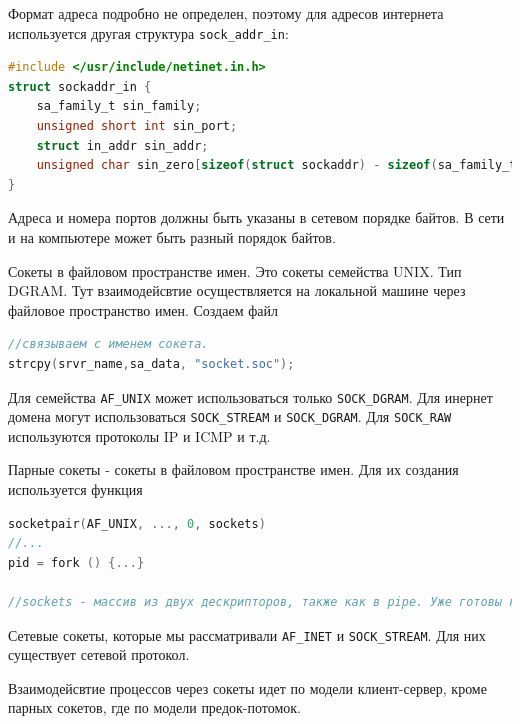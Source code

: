 Формат адреса подробно не определен, поэтому для адресов интернета используется другая структура \verb|sock_addr_in|:

\begin{lstlisting}[language=c]
#include </usr/include/netinet.in.h>
struct sockaddr_in {
	sa_family_t sin_family;
	unsigned short int sin_port;
	struct in_addr sin_addr;
	unsigned char sin_zero[sizeof(struct sockaddr) - sizeof(sa_family_t) - sizeof(uint16_t) - sizeof(struct in_addr)];
}
\end{lstlisting}

Адреса и номера портов должны быть указаны в сетевом порядке байтов. В сети и на компьютере может быть разный порядок байтов.

Сокеты в файловом пространстве имен. Это сокеты семейства UNIX. Тип DGRAM. Тут взаимодейсвтие осуществляется на локальной машине через файловое пространство имен. Создаем файл

\begin{lstlisting}[language=c]
//связываем с именем сокета.
strcpy(srvr_name,sa_data, "socket.soc");
\end{lstlisting}

Для семейства \verb|AF_UNIX| может использоваться только \verb|SOCK_DGRAM|. Для инернет домена могут использоваться \verb|SOCK_STREAM| и \verb|SOCK_DGRAM|. Для \verb|SOCK_RAW|  используются протоколы IP и ICMP и т.д.

Парные сокеты - сокеты в файловом пространстве имен. Для их создания используется функция 

\begin{lstlisting}[language=c]
socketpair(AF_UNIX, ..., 0, sockets)
//...
pid = fork () {...}

//sockets - массив из двух дескрипторов, также как в pipe. Уже готовы к передаче данных и можно сразу применять системные вызовы read/write. fork получает оба дескрпитора, один из которых он должен закрыть с помощью системного вызова close. Несмотря на то, что не используется модель клиент-сервер, которая характерная для сокетов, но если посомтреть, то функция socketpair получает семейство и тип, на основании которых определяется протокол, поэтому считаются полноценными сокетами. Это сделано для общности подхода реализации взаимодейсвтия через сокеты.
\end{lstlisting}

Сетевые сокеты, которые мы рассматривали \verb|AF_INET| и \verb|SOCK_STREAM|. Для них существует сетевой протокол.

Взаимодейсвтие процессов через сокеты идет по модели клиент-сервер, кроме парных сокетов, где по модели предок-потомок.

